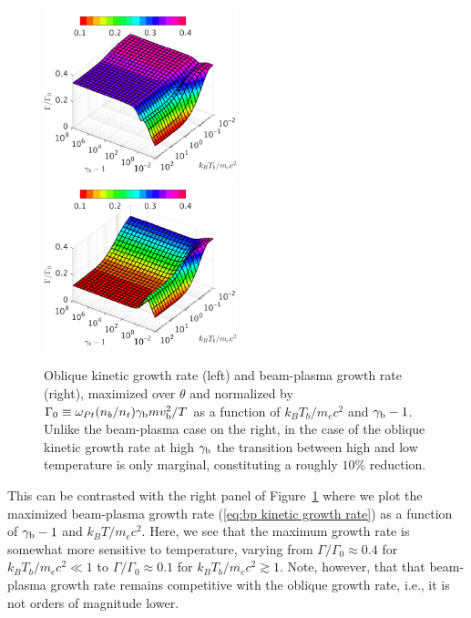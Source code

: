 \documentclass[usenatbib,iop,apj,numberedappendix]{aeb_emulateapj_2015}
\newcommand{\gammabeam}{\ensuremath{\gamma_{\rm b}}}
\newcommand{\vbeam}{\ensuremath{v_{\rm b}}}
\begin{document}
\begin{figure}
\includegraphics[width=0.5\textwidth]{pp2.pdf}
\includegraphics[width=0.5\textwidth]{pp3.pdf}

\caption{Oblique kinetic growth rate (left) and beam-plasma growth rate (right),
  maximized over $\theta$ and normalized by
  $\Gamma_0\equiv\omega_{Pt}(n_b/n_t)\gammabeam m \vbeam^2/T$ as a function of
  $k_BT_b/m_ec^2$ and $\gammabeam-1$.  Unlike the beam-plasma case on the right, in the case of the
    oblique kinetic growth rate at high $\gammabeam$ the transition between high
    and low temperature is only marginal, constituting a roughly $10\%$
    reduction. } \label{fig:OGgen}
\end{figure}

This can be contrasted with the right panel of
  Figure~\ref{fig:OGgen} where we plot the maximized beam-plasma growth rate
(\ref{eq:bp kinetic growth rate}) as a function of $\gammabeam - 1$ and $k_B
T/m_ec^2$.  Here, we see that the maximum growth rate is somewhat more
sensitive to temperature, varying from $\Gamma/\Gamma_0 \approx 0.4$ for
$k_BT_b/m_ec^2 \ll 1$ to $\Gamma/\Gamma_0 \approx 0.1$ for $k_BT_b/m_ec^2 \gtrsim
1$.  Note, however, that that beam-plasma growth rate remains competitive with
the oblique growth rate, i.e., it is not orders of magnitude lower.
\end{document}
